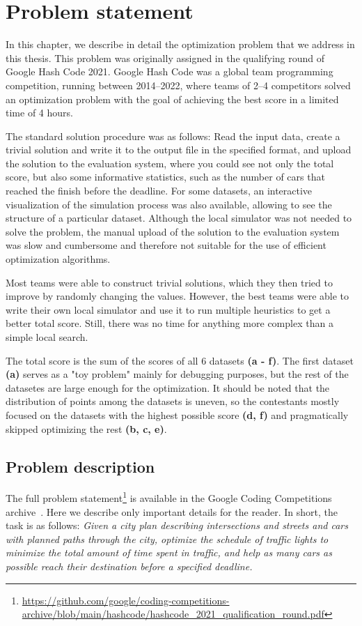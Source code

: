 \chapter{Problem statement}

In this chapter, we describe in detail the optimization problem that we address in this thesis. This problem was originally assigned in the qualifying round of Google Hash Code 2021. Google Hash Code was a global team programming competition, running between 2014--2022, where teams of 2--4 competitors solved an optimization problem with the goal of achieving the best score in a limited time of 4 hours.

The standard solution procedure was as follows: Read the input data, create a trivial solution and write it to the output file in the specified format, and upload the solution to the evaluation system, where you could see not only the total score, but also some informative statistics, such as the number of cars that reached the finish before the deadline. For some datasets, an interactive visualization of the simulation process was also available, allowing to see the structure of a particular dataset. Although the local simulator was not needed to solve the problem, the manual upload of the solution to the evaluation system was slow and cumbersome and therefore not suitable for the use of efficient optimization algorithms.

Most teams were able to construct trivial solutions, which they then tried to improve by randomly changing the values. However, the best teams were able to write their own local simulator and use it to run multiple heuristics to get a better total score. Still, there was no time for anything more complex than a simple local search.

The total score is the sum of the scores of all 6 datasets \textbf{(a - f)}. The first dataset \textbf{(a)} serves as a "toy problem" mainly for debugging purposes, but the rest of the datasetes are large enough for the optimization. It should be noted that the distribution of points among the datasets is uneven, so the contestants mostly focused on the datasets with the highest possible score \textbf{(d, f)} and pragmatically skipped optimizing the rest \textbf{(b, c, e)}.

\section{Problem description}

The full problem statement\footnote{\url{https://github.com/google/coding-competitions-archive/blob/main/hashcode/hashcode_2021_qualification_round.pdf}} is available in the Google Coding Competitions archive~\cite{google_coding_competitions}. Here we describe only important details for the reader.
In short, the task is as follows: \textit{Given a city plan describing intersections and streets and cars with planned paths through the city, optimize the schedule of traffic lights to minimize the total amount of time spent in traffic, and help as many cars as possible reach their destination before a specified deadline.}

